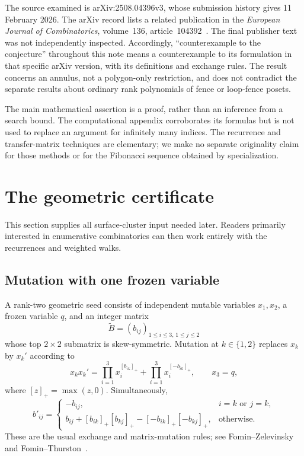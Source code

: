 \documentclass[11pt,letterpaper]{article}
\numberwithin{equation}{section}
\theoremstyle{definition}
\newcommand{\Btilde}{\widetilde B}
\newcommand{\pos}[1]{[#1]_+}
\begin{document}
The source examined is arXiv:2508.04396v3, whose submission history gives
11 February 2026. The arXiv record lists a related publication in the
\emph{European Journal of Combinatorics}, volume~136, article~104392~\cite{KLL}.
The final publisher text was not independently inspected. Accordingly,
``counterexample to the conjecture'' throughout this note means a counterexample
to its formulation in that specific arXiv version, with its definitions and
exchange rules. The result concerns an annulus, not a polygon-only restriction,
and does not contradict the separate results about ordinary rank polynomials
of fence or loop-fence posets.

The main mathematical assertion is a proof, rather than an inference from a
search bound. The computational appendix corroborates its formulas but is not
used to replace an argument for infinitely many indices. The recurrence and
transfer-matrix techniques are elementary; we make no separate originality
claim for those methods or for the Fibonacci sequence obtained by specialization.

\section{The geometric certificate}\label{sec:geometry}

This section supplies all surface-cluster input needed later. Readers primarily
interested in enumerative combinatorics can then work entirely with the
recurrences and weighted walks.

\subsection{Mutation with one frozen variable}

A rank-two geometric seed consists of independent mutable variables $x_1,x_2$,
a frozen variable $q$, and an integer matrix
\[
 \Btilde=(b_{ij})_{1\leq i\leq3,\,1\leq j\leq2}
\]
whose top $2\times2$ submatrix is skew-symmetric. Mutation at $k\in\{1,2\}$
replaces $x_k$ by $x_k'$ according to
\begin{equation}\label{eq:exchange}
 x_kx_k'
 =\prod_{i=1}^{3}x_i^{\pos{b_{ik}}}
  +\prod_{i=1}^{3}x_i^{\pos{-b_{ik}}},
 \qquad x_3=q,
\end{equation}
where $[z]_+=\max(z,0)$. Simultaneously,
\begin{equation}\label{eq:matrixmutation}
 b'_{ij}=\begin{cases}
 -b_{ij},&i=k\text{ or }j=k,\\
 b_{ij}+[b_{ik}]_+[b_{kj}]_+
             -[-b_{ik}]_+[-b_{kj}]_+,&\text{otherwise}.
 \end{cases}
\end{equation}
These are the usual exchange and matrix-mutation rules; see
Fomin--Zelevinsky~\cite{FZ} and Fomin--Thurston~\cite{FT}.
\end{document}
